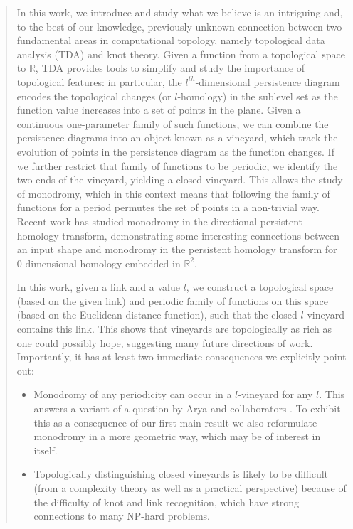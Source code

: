 \documentclass[twoside,leqno]{article}
\begin{document}
\begin{abstract} 
In this work, we introduce and study what we believe is an intriguing and, to the best of our knowledge, previously unknown connection between two fundamental areas in computational topology, namely topological data analysis (TDA) and knot theory.  
Given a  function from a topological space to $\mathbb{R}$, TDA provides tools to simplify and study the importance of topological features: in particular, the $l^{th}$-dimensional persistence diagram encodes the topological changes (or $l$-homology) in the sublevel set as the function value increases into a set of points in the plane. Given a continuous one-parameter family of such functions, we can combine the persistence diagrams into an object known as a vineyard, which track the evolution of points in the persistence diagram as the function changes.  If we further restrict that family of functions to be periodic, we identify the two ends of the vineyard, yielding a closed vineyard.  This allows the study of monodromy, which in this context means that following the family of functions for a period permutes the set of points in a non-trivial way.   Recent work has  studied monodromy in the directional persistent homology transform, demonstrating some interesting connections between an input shape and monodromy in the persistent homology transform for 0-dimensional homology embedded in $\mathbb{R}^2$. 

In this work, given a link and a value $l$, we construct a topological space (based on the given link) and periodic family of functions on this space (based on the Euclidean distance function), such that the closed $l$-vineyard contains this link. 
This shows that vineyards are topologically as rich as one could possibly hope, suggesting many future directions of work.  Importantly, it has at least two immediate consequences we explicitly point out:
\begin{itemize}
    \item Monodromy of any periodicity can occur in a $l$-vineyard for any $l$. This answers a variant of a question by Arya and collaborators \cite{Arya2024}. To exhibit this as a consequence of our first main result we also reformulate monodromy in a more geometric way, which may be of interest in itself. 
    \item Topologically distinguishing closed vineyards is likely to be difficult (from a complexity theory as well as a practical perspective) because of the difficulty of knot and link recognition, which have strong connections to many NP-hard problems.
\end{itemize}

\end{abstract} 
\end{document}

